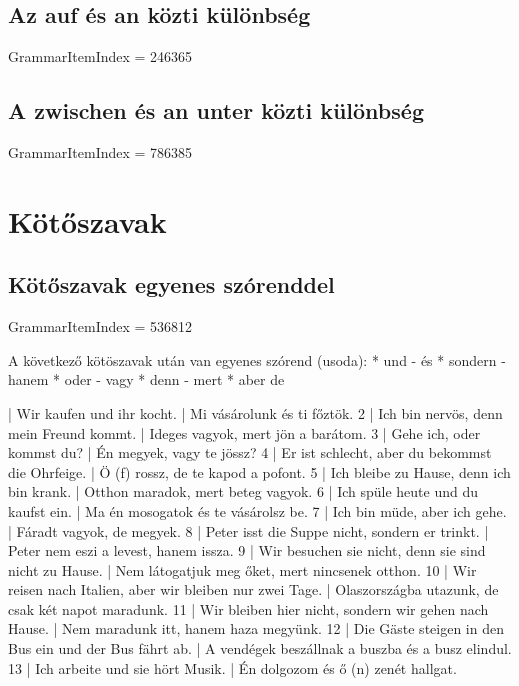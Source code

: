 \documentclass{article}
\newenvironment{desc}{\verbatim}{\endverbatim}
\newenvironment{exmp}{\verbatim}{\endverbatim}
\begin{document}
\subsection{Az auf és an közti különbség}

GrammarItemIndex = 246365

\subsection{A zwischen és an unter közti különbség}

GrammarItemIndex = 786385

\section{Kötőszavak}

\subsection{Kötőszavak egyenes szórenddel}

GrammarItemIndex = 536812

\begin{desc}
A következő kötöszavak után van egyenes szórend (usoda):
* und - és
* sondern - hanem
* oder - vagy
* denn - mert
* aber  de
\end{desc}

\begin{exmp}
1 | Wir kaufen und ihr kocht. | Mi vásárolunk és ti főztök.
2 | Ich bin nervös, denn mein Freund kommt. | Ideges vagyok, mert jön a barátom.
3 | Gehe ich, oder kommst du? | Én megyek, vagy te jössz?
4 | Er ist schlecht, aber du bekommst die Ohrfeige. | Ö (f) rossz, de te kapod a pofont.
5 | Ich bleibe zu Hause, denn ich bin krank. | Otthon maradok, mert beteg vagyok.
6 | Ich spüle heute und du kaufst ein. | Ma én mosogatok és te vásárolsz be.
7 | Ich bin müde, aber ich gehe. | Fáradt vagyok, de megyek.
8 | Peter isst die Suppe nicht, sondern er trinkt. | Peter nem eszi a levest, hanem issza.
9 | Wir besuchen sie nicht, denn sie sind nicht zu Hause. | Nem látogatjuk meg őket, mert nincsenek otthon.
10 | Wir reisen nach Italien, aber wir bleiben nur zwei Tage. | Olaszországba utazunk, de csak két napot maradunk.
11 | Wir bleiben hier nicht, sondern wir gehen nach Hause. | Nem maradunk itt, hanem haza megyünk.
12 | Die Gäste steigen in den Bus ein und der Bus fährt ab. | A vendégek beszállnak a buszba és a busz elindul.
13 | Ich arbeite und sie hört Musik. | Én dolgozom és ő (n) zenét hallgat.
\end{exmp}
\end{document}
